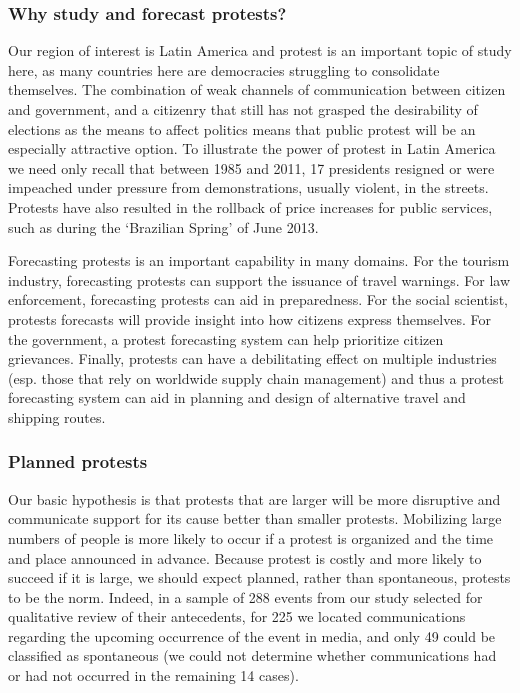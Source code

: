 \documentclass[letterpaper]{article}
\begin{document}
\subsubsection{Why study and forecast protests?}
Our region of interest is Latin America and protest
is an important topic of study here,
as many countries here are democracies struggling to consolidate themselves. The combination of weak channels of communication 
between citizen and government, and a citizenry that still has not grasped the desirability of elections as the means to affect politics 
means that public protest will be an especially attractive option. To 
illustrate the power of protest in Latin America we need only recall 
that between 1985 and 2011, 17 presidents resigned or were impeached under pressure from demonstrations, usually violent, in the streets. Protests have 
also resulted in the rollback of price increases for public services, such as during the ‘Brazilian Spring’ of June 2013.

Forecasting protests is an important capability in many domains.
For the tourism industry, forecasting protests can
support the issuance of travel warnings. For law enforcement,
forecasting protests can aid in preparedness. For the social scientist,
protests forecasts will provide insight into how citizens express themselves.
For the government, a protest forecasting system can help prioritize
citizen grievances. Finally, protests can have a debilitating effect on
multiple industries (esp. those that rely on worldwide supply chain management)
and thus a protest forecasting system can aid in planning and design
of alternative travel and shipping routes.

\vspace{-.5em}
\subsubsection{Planned protests}
Our basic hypothesis is that
protests that are larger will be more disruptive and communicate support for its cause better than smaller protests. 
Mobilizing large numbers of people is more likely to occur if a protest is organized and the time and place announced in
advance. Because protest is costly and more likely to succeed if it is large, we should expect planned, rather than 
spontaneous, protests to be the norm. Indeed, in a sample of 288 events from our study selected for qualitative review of their antecedents,
for 225 we located communications regarding the upcoming occurrence of the event in media, and only 49 could be classified as 
spontaneous (we could not determine whether communications had or had not occurred in the remaining 14 cases).
\end{document}
